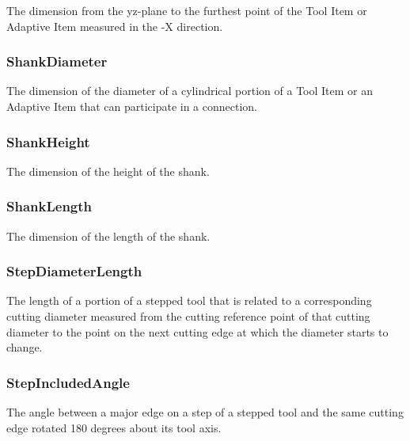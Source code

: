 The dimension from the yz-plane to the furthest point of the Tool Item or Adaptive Item measured in the -X direction.



\subsubsection{ShankDiameter}
\label{sec:ShankDiameter}



The dimension of the diameter of a cylindrical portion of a Tool Item or an Adaptive Item that can participate in a connection.



\subsubsection{ShankHeight}
\label{sec:ShankHeight}



The dimension of the height of the shank.



\subsubsection{ShankLength}
\label{sec:ShankLength}



The dimension of the length of the shank.



\subsubsection{StepDiameterLength}
\label{sec:StepDiameterLength}



The length of a portion of a stepped tool that is related to a corresponding cutting diameter measured from the cutting reference point of that cutting diameter to the point on the next cutting edge at which the diameter starts to change.



\subsubsection{StepIncludedAngle}
\label{sec:StepIncludedAngle}



The angle between a major edge on a step of a stepped tool and the same cutting edge rotated 180 degrees about its tool axis.



